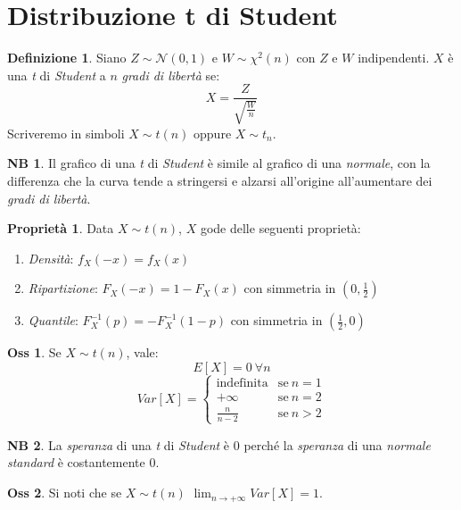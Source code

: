 \documentclass[12pt, a4paper]{report}
\theoremstyle{definition}
\newtheorem{definition}{Definizione}[section]
\newtheorem*{observation}{Oss}
\newtheorem*{property}{Proprietà}
\newtheorem*{note}{NB}
\DeclareRobustCommand{\norm}{\mathcal{N}}
\begin{document}
\section{Distribuzione t di Student}

\begin{definition}
	Siano $Z\sim\norm(0,1)$ e $W\sim\chi^2(n)$ con $Z$ e $W$ indipendenti. $X$ è
	una \emph{t} di \emph{Student} a $n$ \emph{gradi di libertà} se:
	\[X=\frac{Z}{\sqrt{\frac{W}{n}}}\]
	Scriveremo in simboli \(X\sim t(n)\) oppure \(X\sim t_n\).
\end{definition}

\begin{note}
	Il grafico di una \emph{t} di \emph{Student} è simile al grafico di una
	\emph{normale}, con la differenza che la curva tende a stringersi e alzarsi
	all'origine all'aumentare dei \emph{gradi di libertà}.
\end{note}

\begin{property}
	Data $X\sim t(n)$, $X$ gode delle seguenti proprietà:
	\begin{enumerate}[label=(\roman*)]
		\item \emph{Densità}: \(f_X(-x)=f_X(x)\)
		\item \emph{Ripartizione}: \(F_X(-x)=1-F_X(x)\) con simmetria in $(0,\frac{1}{2})$
		\item \emph{Quantile}: \(F_X^{-1}(p)=-F_X^{-1}(1-p)\) con simmetria in
		$(\frac{1}{2},0)$
	\end{enumerate}
\end{property}

\begin{observation}
	Se $X\sim t(n)$, vale:
	\[E[X]=0\ \forall n\]
	\[Var[X]=\begin{cases}
		{\text{indefinita}} & \text{se}\ {n=1}\\
		{+\infty} & \text{se}\ {n=2}\\
		{\frac{n}{n-2}} & \text{se}\ {n>2}
	\end{cases}\]
\end{observation}

\begin{note}
	La \emph{speranza} di una \emph{t} di \emph{Student} è $0$ perché la
	\emph{speranza} di una \emph{normale standard} è costantemente $0$.
\end{note}

\begin{observation}
	Si noti che se $X\sim t(n)$ \(\lim_{n\to +\infty}Var[X]=1\).
\end{observation}
\end{document}
